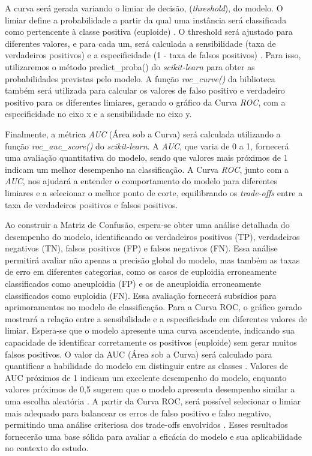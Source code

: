 A curva será gerada variando o limiar de decisão, (\textit{threshold}), do modelo. O limiar define a probabilidade a partir da qual uma instância será classificada como pertencente à classe positiva (euploide) \cite{vilela2022}. O threshold será ajustado para diferentes valores, e para cada um, será calculada a sensibilidade (taxa de verdadeiros positivos) e a especificidade (1 - taxa de falsos positivos) \cite{vilela2022}. Para isso, utilizaremos o método predict\_proba() do \textit{scikit-learn} para obter as probabilidades previstas pelo modelo. A função \textit{roc\_curve()} da biblioteca também será utilizada para calcular os valores de falso positivo e verdadeiro positivo para os diferentes limiares, gerando o gráfico da Curva \textit{ROC}, com a especificidade no eixo x e a sensibilidade no eixo y. 

Finalmente, a métrica \textit{AUC} (Área sob a Curva) será calculada utilizando a função \textit{roc\_auc\_score()} do \textit{scikit-learn}. A \textit{AUC}, que varia de 0 a 1, fornecerá uma avaliação quantitativa do modelo, sendo que valores mais próximos de 1 indicam um melhor desempenho na classificação. A Curva \textit{ROC}, junto com a \textit{AUC}, nos ajudará a entender o comportamento do modelo para diferentes limiares e a selecionar o melhor ponto de corte, equilibrando os \textit{trade-offs} entre a taxa de verdadeiros positivos e falsos positivos.

Ao construir a Matriz de Confusão, espera-se obter uma análise detalhada do desempenho do modelo, identificando os verdadeiros positivos (TP), verdadeiros negativos (TN), falsos positivos (FP) e falsos negativos (FN). Essa análise permitirá avaliar não apenas a precisão global do modelo, mas também as taxas de erro em diferentes categorias, como os casos de euploidia erroneamente classificados como aneuploidia (FP) e os de aneuploidia erroneamente classificados como euploidia (FN). Essa avaliação fornecerá subsídios para aprimoramentos no modelo de classificação. Para a Curva ROC, o gráfico gerado mostrará a relação entre a sensibilidade e a especificidade em diferentes valores de limiar. Espera-se que o modelo apresente uma curva ascendente, indicando sua capacidade de identificar corretamente os positivos (euploide) sem gerar muitos falsos positivos. O valor da AUC (Área sob a Curva) será calculado para quantificar a habilidade do modelo em distinguir entre as classes \cite{vilela2022}. Valores de AUC próximos de 1 indicam um excelente desempenho do modelo, enquanto valores próximos de 0,5 sugerem que o modelo apresenta desempenho similar a uma escolha aleatória \cite{vilela2022}. A partir da Curva ROC, será possível selecionar o limiar mais adequado para balancear os erros de falso positivo e falso negativo, permitindo uma análise criteriosa dos trade-offs envolvidos \cite{vilela2022}. Esses resultados fornecerão uma base sólida para avaliar a eficácia do modelo e sua aplicabilidade no contexto do estudo.

